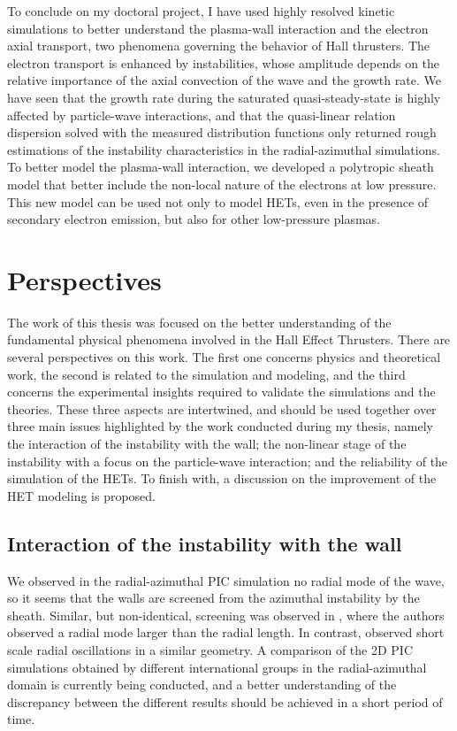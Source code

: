 \vspace{2em}
    To conclude on my doctoral project, I have used highly resolved kinetic simulations to better understand the plasma-wall interaction and the electron axial transport, two phenomena governing the behavior of Hall thrusters.
    The electron transport is enhanced by instabilities, whose amplitude depends on the relative importance of the axial convection of the wave and the growth rate.
    We have seen that the growth rate during the saturated quasi-steady-state is highly affected by particle-wave interactions, and that the quasi-linear relation dispersion solved with the measured distribution functions only returned rough estimations of the instability characteristics in the radial-azimuthal simulations.
    To better model the plasma-wall interaction, we developed a polytropic sheath model that better include the non-local nature of the electrons at low pressure.
    This new model can be used not only to model HETs, even in the presence of secondary electron emission, but also for other low-pressure plasmas.

    

\section{Perspectives}

  The work of this thesis was focused on the better understanding of the fundamental physical phenomena involved in the Hall Effect Thrusters.
  There are several perspectives on this work.
  The first one concerns physics and theoretical work, the second is related to the simulation and modeling, and the third concerns the experimental insights required to validate the simulations and the theories.
  These three aspects are intertwined, and should be used together over three main issues highlighted by the work conducted during my thesis, namely the interaction of the instability with the wall\string; the non-linear stage of the instability with a focus on the particle-wave interaction\string; and the reliability of the simulation of the HETs.
  To finish with, a discussion on the improvement of the HET modeling is proposed.

  \subsection{Interaction of the instability with the wall}

    We observed in the radial-azimuthal PIC simulation no radial mode of the wave, so it seems that the walls are screened from the azimuthal instability by the sheath.
    Similar, but non-identical, screening was observed in \citet{janhunen2018}, where the authors observed a radial mode larger than the radial length.
    In contrast, \citet{taccogna2019} observed short scale radial oscillations in a similar geometry.
    A comparison of the 2D PIC simulations obtained by different international groups in the radial-azimuthal domain is currently being conducted, and a better understanding of the discrepancy between the different results should be achieved in a short period of time.

